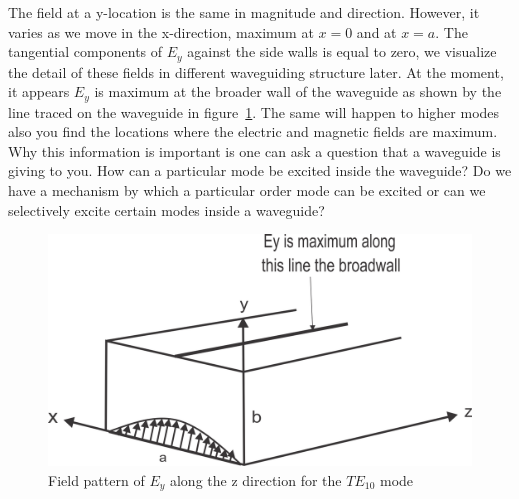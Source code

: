 The field at a y-location is the same in magnitude and direction. However, it varies as we move in the x-direction, maximum at $x = 0$ and at $x = a$. The tangential components of $E_y$ against the side walls is equal to zero, we visualize the detail of these fields in different waveguiding structure later. At the moment, it appears $E_y$ is maximum at the broader wall of the waveguide as shown by the line traced on the waveguide in figure~\ref{fig:lec39-2}. The same will happen to higher modes also you find the locations where the electric and magnetic fields are maximum. Why this information is important is one can ask a question that a waveguide is giving to you. How can a particular mode be excited inside the waveguide? Do we have a mechanism by which a particular order mode can be excited or can we selectively excite certain modes inside a waveguide?
\begin{figure}[h]
\centering
\includegraphics[width=1\linewidth]{./graphics/group39-2}
\caption{Field pattern of $E_y$ along the z direction for the $TE_{10}$ mode}
\label{fig:lec39-2}
\end{figure}

